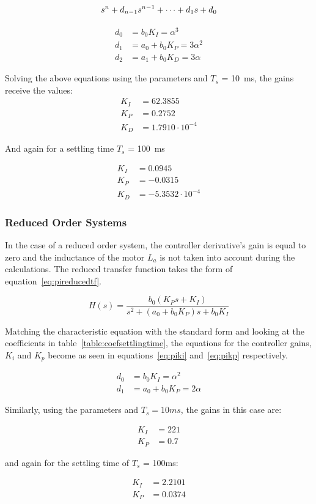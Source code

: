 \begin{equation}
\centering
\label{eq:stdchararacteristic}
s^n + d_{n-1}s^{n-1} + \cdots + d_1 s + d_0 
\end{equation}

\begin{align}
\label{eq:pidki}
d_0 &= b_0 K_I = \alpha^3
\\
\label{eq:pidkp}
d_1 &= a_0 + b_0 K_P = 3\alpha^2
\\
\label{eq:pidkd}
d_2 &= a_1 + b_0 K_D = 3\alpha
\end{align}

Solving the above equations using the parameters and $T_s$ = 10~ms, the gains receive the values:
\begin{align*}
K_I &= 62.3855
\\
K_P &= 0.2752
\\
K_D &= 1.7910\cdot10^{-4}
\end{align*}

And again for a settling time $T_s$ = 100~ms

\begin{align*}
K_I &= 0.0945
\\
K_P &= -0.0315
\\
K_D &= -5.3532\cdot10^{-4}
\end{align*}


\subsubsection{Reduced Order Systems}
In the case of a reduced order system, the controller derivative's gain is equal to zero and the inductance of the motor $L_a$ is not taken into account during the calculations. The reduced transfer function takes the form of equation~\ref{eq:pireducedtf}.

\begin{equation}
\label{eq:pireducedtf}
H(s) = \dfrac{b_0(K_Ps + K_I)}{s^2 + (a_0 + b_0 K_P)s + b_0 K_I }
\end{equation}

Matching the characteristic equation with the standard form and looking at the coefficients in table~\ref{table:coefsettlingtime}, the equations for the controller gains, $K_i$ and $K_p$ become as seen in equations~\ref{eq:piki} and~\ref{eq:pikp} respectively.

\begin{align}
\label{eq:piki}
d_0 &= b_0 K_I = \alpha^2
\\
\label{eq:pikp}
d_1 &= a_0 + b_0 K_P = 2\alpha
\end{align}

Similarly, using the parameters and $T_s=10ms$, the gains in this case are:

\begin{align*}
K_I &= 221
\\
K_P &= 0.7
\end{align*}
 
 and again for the settling time of $T_s$ = 100ms:
 
 \begin{align*}
 K_I &= 2.2101
 \\
 K_P &= 0.0374
 \end{align*}
 